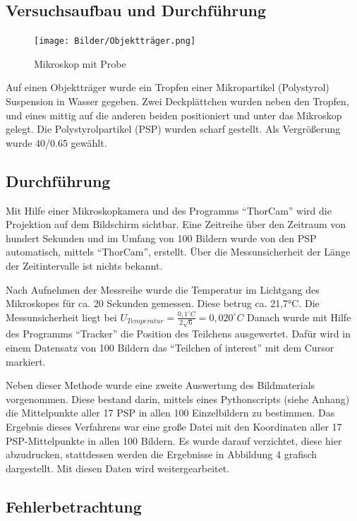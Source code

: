 \documentclass[
  9pt,
]{article}
\begin{document}
\hypertarget{versuchsaufbau-und-durchfuxfchrung}{%
\subsection{Versuchsaufbau und
Durchführung}\label{versuchsaufbau-und-durchfuxfchrung}}

\begin{figure}
\centering
\texttt{[image: Bilder/Objektträger.png]}
\caption{Mikroskop mit Probe}
\end{figure}

Auf einen Objektträger wurde ein Tropfen einer Mikropartikel
(Polystyrol) Suspension in Wasser gegeben. Zwei Deckplättchen wurden
neben den Tropfen, und eines mittig auf die anderen beiden positioniert
und unter das Mikroskop gelegt. Die Polystyrolpartikel (PSP) wurden
scharf gestellt. Als Vergrößerung wurde 40/0.65 gewählt.

\hypertarget{durchfuxfchrung}{%
\subsection{Durchführung}\label{durchfuxfchrung}}

Mit Hilfe einer Mikroskopkamera und des Programms ``ThorCam'' wird die
Projektion auf dem Bildschirm sichtbar. Eine Zeitreihe über den Zeitraum
von hundert Sekunden und im Umfang von 100 Bildern wurde von den PSP
automatisch, mittels ``ThorCam'', erstellt. Über die Messunsicherheit
der Länge der Zeitintervalle ist nichts bekannt.

Nach Aufnehmen der Messreihe wurde die Temperatur im Lichtgang des
Mikroskopes für ca. 20 Sekunden gemessen. Diese betrug ca. 21,7°C. Die
Messunsicherheit liegt bei
\(U_{Temperatur}=\frac{0,1^{\circ}C}{2\sqrt{6}}= 0,020^{\circ}C\) Danach
wurde mit Hilfe des Programms ``Tracker'' die Position des Teilchens
ausgewertet. Dafür wird in einem Datensatz von 100 Bildern das
``Teilchen of interest'' mit dem Cursor markiert.

Neben dieser Methode wurde eine zweite Auswertung des Bildmaterials
vorgenommen. Diese bestand darin, mittels eines Pythonscripts (siehe
Anhang) die Mittelpunkte aller 17 PSP in allen 100 Einzelbildern zu
bestimmen. Das Ergebnis dieses Verfahrens war eine große Datei mit den
Koordinaten aller 17 PSP-Mittelpunkte in allen 100 Bildern. Es wurde
darauf verzichtet, diese hier abzudrucken, stattdessen werden die
Ergebnisse in Abbildung 4 grafisch dargestellt. Mit diesen Daten wird
weitergearbeitet.

\hypertarget{fehlerbetrachtung}{%
\subsection{Fehlerbetrachtung}\label{fehlerbetrachtung}}
\end{document}
